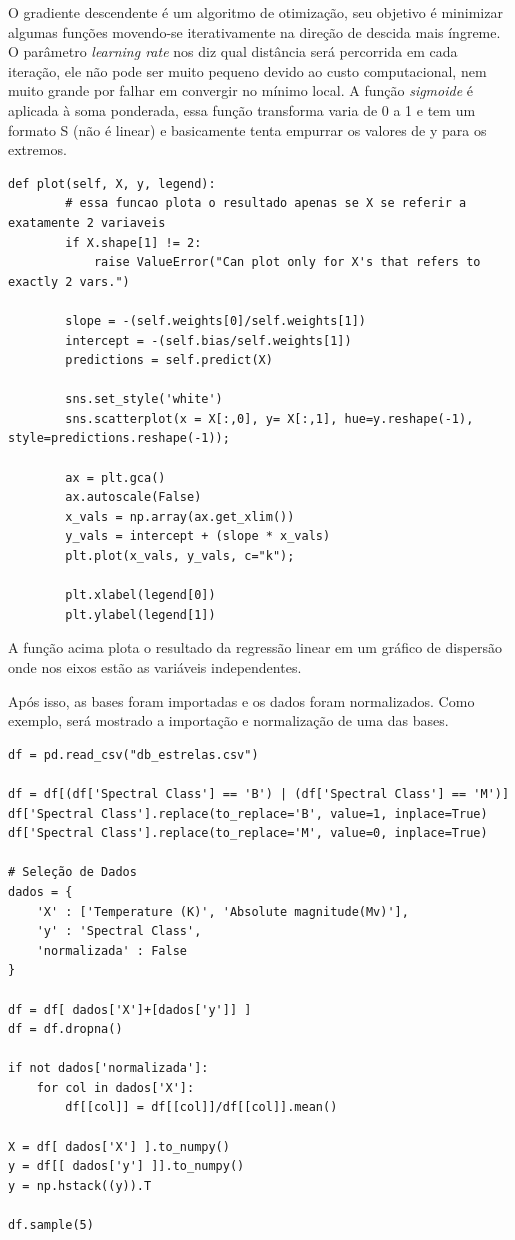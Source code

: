 \documentclass[12pt]{article}
\begin{document}
O gradiente descendente é um algoritmo de otimização, seu objetivo é minimizar algumas funções movendo-se iterativamente na direção de descida mais íngreme. O parâmetro \textit{learning rate} nos diz qual distância será percorrida em cada iteração, ele não pode ser muito pequeno devido ao custo computacional, nem muito grande por falhar em convergir no mínimo local. A função \textit{sigmoide} é aplicada à soma ponderada, essa função transforma varia de 0 a 1 e tem um formato S (não é linear) e basicamente tenta empurrar os valores de y para os extremos.
\\
\begin{lstlisting}
def plot(self, X, y, legend):
        # essa funcao plota o resultado apenas se X se referir a exatamente 2 variaveis
        if X.shape[1] != 2:
            raise ValueError("Can plot only for X's that refers to exactly 2 vars.")
        
        slope = -(self.weights[0]/self.weights[1])
        intercept = -(self.bias/self.weights[1])
        predictions = self.predict(X)

        sns.set_style('white')
        sns.scatterplot(x = X[:,0], y= X[:,1], hue=y.reshape(-1), style=predictions.reshape(-1));

        ax = plt.gca()
        ax.autoscale(False)
        x_vals = np.array(ax.get_xlim())
        y_vals = intercept + (slope * x_vals)
        plt.plot(x_vals, y_vals, c="k");
        
        plt.xlabel(legend[0])
        plt.ylabel(legend[1])
\end{lstlisting}

A função acima plota o resultado da regressão linear em um gráfico de dispersão onde nos eixos estão as variáveis independentes.

\vspace{100pt}

Após isso, as bases foram importadas e os dados foram normalizados. Como exemplo, será mostrado a importação e normalização de uma das bases.
\\
\begin{lstlisting}
df = pd.read_csv("db_estrelas.csv")

df = df[(df['Spectral Class'] == 'B') | (df['Spectral Class'] == 'M')]
df['Spectral Class'].replace(to_replace='B', value=1, inplace=True)
df['Spectral Class'].replace(to_replace='M', value=0, inplace=True)

# Seleção de Dados
dados = {
    'X' : ['Temperature (K)', 'Absolute magnitude(Mv)'],
    'y' : 'Spectral Class',
    'normalizada' : False
}

df = df[ dados['X']+[dados['y']] ]
df = df.dropna()

if not dados['normalizada']:
    for col in dados['X']:
        df[[col]] = df[[col]]/df[[col]].mean()

X = df[ dados['X'] ].to_numpy()
y = df[[ dados['y'] ]].to_numpy()
y = np.hstack((y)).T

df.sample(5)
\end{lstlisting}
\end{document}

